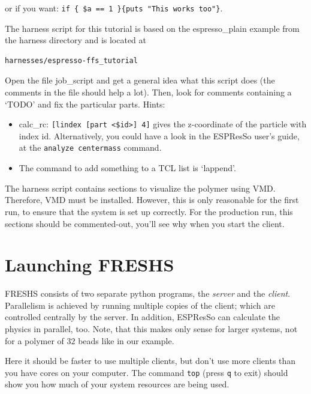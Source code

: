 \documentclass[a4paper,oneside]{article}
\newenvironment{mylisting}
{\begin{list}{}{\setlength{\leftmargin}{1em}}\item\scriptsize\bfseries}
{\end{list}}
\begin{document}
or if you want: \verb+if { $a == 1 }{puts "This works too"}+.




The harness script for this tutorial is based on the espresso\_plain example from the harness directory and is located at
\begin{mylisting}
\begin{verbatim}
harnesses/espresso-ffs_tutorial
\end{verbatim}
\end{mylisting}
Open the file job\_script and get a general idea what this script does (the comments in the file should help a lot). Then, look for comments containing a `TODO' and fix the particular parts. Hints:
\begin{itemize}
 \item calc\_rc: \verb+[lindex [part <$id>] 4]+
gives the z-coordinate of the particle with index id. Alternatively, you could have a look in the ESPResSo user's guide, at the \verb+analyze centermass+ command.
 \item The command to add something to a TCL list is `lappend'.
\end{itemize}
The harness script contains sections to visualize the polymer using VMD. Therefore, VMD must be installed. However, this is only reasonable for the first run, to ensure that the system is set up correctly. For the production run, this sections should be commented-out, you'll see why when you start the client.


\section{Launching FRESHS}

FRESHS consists of two separate python programs, the {\it server} and the {\it client}.  Parallelism is achieved by running multiple copies of the client; which are controlled centrally by the server. In addition, ESPResSo can calculate the physics in parallel, too. Note, that this makes only sense for larger systems, not for a polymer of $32$ beads like in our example. 

Here it should be faster to use multiple clients, but don't use more clients than you have cores on your computer. The command \verb+top+ (press \verb+q+ to exit) should show you how much of your system resources are being used.
\end{document}
